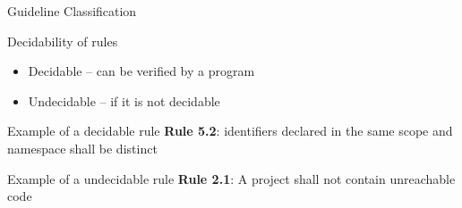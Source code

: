 \documentclass[t]{beamer} %
\begin{document}

\begin{frame}{Guideline Classification}
 \begin{block}{Decidability of rules}
	 \begin{itemize}
	     \item Decidable -- can be verified by a program
	     \item Undecidable -- if it is not decidable
	 \end{itemize}
\end{block}	 
\begin{block}{Example of a decidable rule}
\textbf{Rule 5.2}: identifiers declared in the same scope and namespace shall be
distinct 
\end{block}

\begin{block}{Example of a undecidable rule}
\textbf{Rule 2.1}: A project shall not contain unreachable code
\end{block}

\end{frame}
\end{document}
